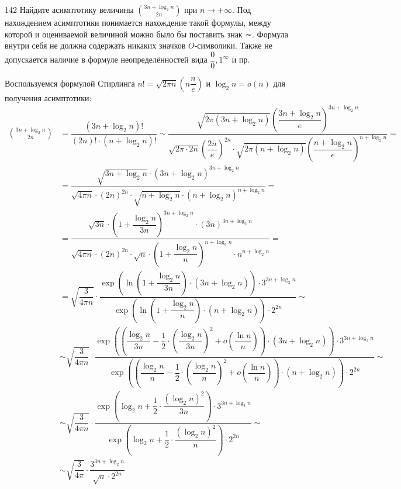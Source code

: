 \begin{task}{142}
	Найдите асимптотику величины $\binom{3n+\log_2n}{2n}$ при $n \rightarrow +\infty$. Под нахождением асимптотики понимается нахождение такой формулы, между которой и оцениваемой величиной можно было бы поставить знак ∼. Формула внутри себя не должна содержать никаких значков $O$‑символики. Также не допускается наличие в формуле неопределённостей вида $\dfrac{0}{0}, 1^{\infty}$ и пр.
\end{task}

\begin{solution} 
    Воспользуемся формулой Стирлинга
    $ n! = \sqrt{2\pi n} \left( n\dfrac{n}{e}\right)$ и $ \log_2n = o(n)$ для получения асимптотики:
    \[
        \begin{split}
            \binom{3n+\log_2n}{2n} &=\dfrac{(3n+\log_2n)!} {(2n)! \cdot (n+\log_2n)!} \sim \dfrac{\sqrt{2\pi (3n+\log_2n)} \left( \dfrac{3n+\log_2n}{e}\right)^{3n+\log_2n}}{\sqrt{2\pi \cdot 2n} \left( \dfrac{2n}{e}\right)^{2n} \cdot \sqrt{2\pi (n+\log_2n)} \left( \dfrac{n+\log_2n}{e}\right)^{n+\log_2n}} = \\ &= \dfrac{\sqrt{3n+\log_2n} \cdot  (3n+\log_2n)^{3n+\log_2n}}{\sqrt{4\pi n} \cdot (2n)^{2n} \cdot \sqrt{n+\log_2n} \cdot (n+\log_2n)^{n+\log_2n}} = \\ &= \dfrac{\sqrt{3n} \cdot \left(1+\dfrac{\log_2n}{3n}\right)^{3n+\log_2n} \cdot (3n)^{3n+\log_2n}}{\sqrt{4\pi n} \cdot (2n)^{2n} \cdot \sqrt{n} \cdot \left(1+\dfrac{\log_2n}{n}\right)^{n+\log_2n} \cdot n^{n+\log_2n}} = \\ &= \sqrt{\dfrac{3}{4\pi n}} \cdot \dfrac{\exp{\left(\ln \left(1+\dfrac{\log_2n}{3n}\right)\cdot (3n+\log_2n)\right)} \cdot 3^{3n+\log_2n}}{ \exp{\left(\ln{\left(1+\dfrac{\log_2n}{n}\right)}\cdot (n+\log_2n)\right)} \cdot 2^{2n}} \sim \\ &\sim  \sqrt{\dfrac{3}{4\pi n}} \cdot \dfrac{\exp{\left( \left(\dfrac{\log_2n}{3n} - \dfrac{1}{2} \cdot \left(\dfrac{\log_2n}{3n}\right)^2 + o\left(\dfrac{\ln n}{n}\right)\right) \cdot (3n+\log_2n)\right)} \cdot 3^{3n+\log_2n}}{ \exp{\left( \left(\dfrac{\log_2n}{n} - \dfrac{1}{2} \cdot \left(\dfrac{\log_2n}{n}\right)^2 + o\left(\dfrac{\ln n}{n}\right)\right) \cdot (n+\log_2n)\right)} \cdot 2^{2n}} \sim \\ &\sim \sqrt{\dfrac{3}{4\pi n}} \cdot \dfrac{\exp{\left(\log_2n + \dfrac{1}{2} \cdot \dfrac{(\log_2n)^2}{3n}\right)} \cdot 3^{3n+\log_2n}}{ \exp{\left(\log_2n + \dfrac{1}{2} \cdot \dfrac{(\log_2n)^2}{n}\right)} \cdot 2^{2n}} \sim \\ &\sim \sqrt{\dfrac{3}{4\pi}} \cdot \dfrac{3^{3n+\log_2n}}{\sqrt{n} \cdot 2^{2n}} 
        \end{split}
    \]
\end{solution}